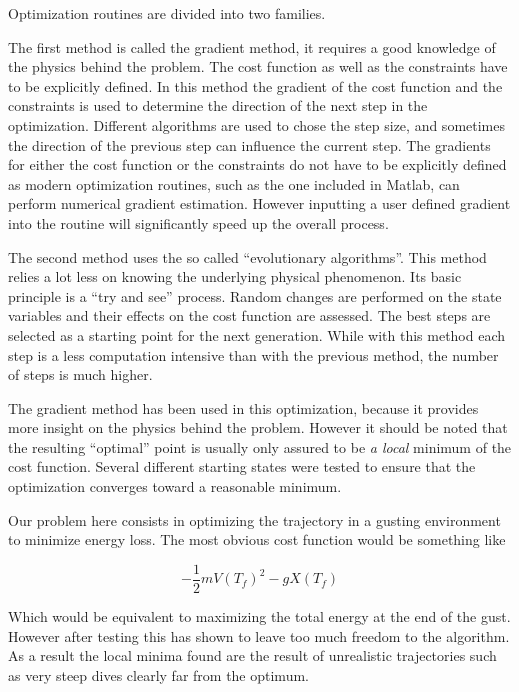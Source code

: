 \par Optimization routines are divided into two families. 

\par The first method is called the gradient method, it requires a good knowledge of the physics behind the problem.
The cost function as well as the constraints have to be explicitly defined.
In this method the gradient of the cost function and the constraints is used to determine the direction of the next step in the optimization.
Different algorithms are used to chose the step size, and sometimes the direction of the previous step can influence the current step.
The gradients for either the cost function or the constraints do not have to be explicitly defined as modern optimization routines, such as the one included in Matlab, can perform numerical gradient estimation.
However inputting a user defined gradient into the routine will significantly speed up the overall process.

\par The second method uses the so called ``evolutionary algorithms''. 
This method relies a lot less on knowing the underlying physical phenomenon.
Its basic principle is a ``try and see'' process.
Random changes are performed on the state variables and their effects on the cost function are assessed.
The best steps are selected as a starting point for the next generation.
While with this method each step is a less computation intensive than with the previous method, the number of steps is much higher.

\par The gradient method has been used in this optimization, because it provides more insight on the physics behind the problem.
However it should be noted that the resulting ``optimal'' point is usually only assured to be \emph{a local} minimum of the cost function.
Several different starting states were tested to ensure that the optimization converges toward a reasonable minimum.

Our problem here consists in optimizing the trajectory in a gusting environment to minimize energy loss.
The most obvious cost function would be something like

\begin{equation}
  - \frac{1}{2}m{V(T_f)}^2 - gX(T_f)
  \label{eqn:eni_cost_fun}
\end{equation}

Which would be equivalent to maximizing the total energy at the end of the gust.
However after testing this has shown to leave too much freedom to the algorithm. 
As a result the local minima found are the result of unrealistic trajectories such as very steep dives clearly far from the optimum.

